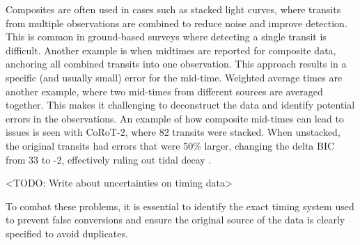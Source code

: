 \documentclass[oneside,12pt]{amsart}
\numberwithin{page}{section}
\begin{document}
Composites are often used in cases such as stacked light curves, where transits from multiple observations are combined to reduce noise and improve detection. This is common in ground-based surveys where detecting a single transit is difficult. Another example is when midtimes are reported for composite data, anchoring all combined transits into one observation. This approach results in a specific (and usually small) error for the mid-time. Weighted average times are another example, where two mid-times from different sources are averaged together. This makes it challenging to deconstruct the data and identify potential errors in the observations. An example of how composite mid-times can lead to issues is seen with CoRoT-2, where 82 transits were stacked. When unstacked, the original transits had errors that were 50\% larger, changing the delta BIC from 33 to -2, effectively ruling out tidal decay \citep{adams2024doomed}.

<TODO: Write about uncertainties on timing data>

To combat these problems, it is essential to identify the exact timing system used to prevent false conversions and ensure the original source of the data is clearly specified to avoid duplicates.




\end{document}
